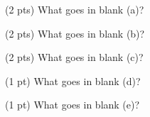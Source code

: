 \begin{prob}[(8 pts)]
\begin{subprobset}
\begin{subprob}(2 pts) What goes in blank (a)?

\begin{responsebox}{0.5in}
    
\end{responsebox}
    
\end{subprob}

\begin{subprob}(2 pts) What goes in blank (b)?

\begin{responsebox}{0.5in}
    
\end{responsebox}
    
\end{subprob}

\begin{subprob}(2 pts) What goes in blank (c)?




    
\end{subprob}

\begin{subprob}(1 pt) What goes in blank (d)?


\end{subprob}

\begin{subprob}(1 pt) What goes in blank (e)?


\end{subprob}

    
\end{subprobset}

\end{prob}

\newpage


